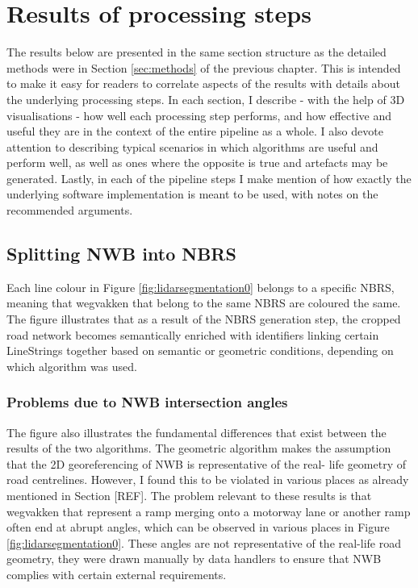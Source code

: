 \section{Results of processing steps}
\label{sec:results}

The results below are presented in the same section structure as the detailed methods were in Section \ref{sec:methods} of the previous chapter. This is intended to make it easy for readers to correlate aspects of the results with details about the underlying processing steps. In each section, I describe - with the help of 3D visualisations - how well each processing step performs, and how effective and useful they are in the context of the entire pipeline as a whole. I also devote attention to describing typical scenarios in which algorithms are useful and perform well, as well as ones where the opposite is true and artefacts may be generated. Lastly, in each of the pipeline steps I make mention of how exactly the underlying software implementation is meant to be used, with notes on the recommended arguments.

\subsection{Splitting NWB into NBRS}
\label{sub:r_nbrsgeneration}

Each line colour in Figure \ref{fig:lidarsegmentation0} belongs to a specific NBRS, meaning that wegvakken that belong to the same NBRS are coloured the same. The figure illustrates that as a result of the NBRS generation step, the cropped road network becomes semantically enriched with identifiers linking certain LineStrings together based on semantic or geometric conditions, depending on which algorithm was used.

\subsubsection{Problems due to NWB intersection angles}

The figure also illustrates the fundamental differences that exist between the results of the two algorithms. The geometric algorithm makes the assumption that the 2D georeferencing of NWB is representative of the real- life geometry of road centrelines. However, I found this to be violated in various places as already mentioned in Section [REF]. The problem relevant to these results is that wegvakken that represent a ramp merging onto a motorway lane or another ramp often end at abrupt angles, which can be observed in various places in Figure \ref{fig:lidarsegmentation0}. These angles are not representative of the real-life road geometry, they were drawn manually by data handlers to ensure that NWB complies with certain external requirements.

